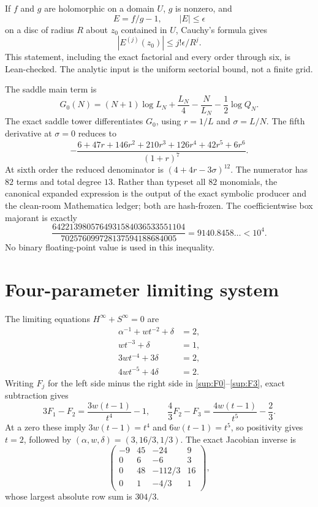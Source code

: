 \documentclass[10pt]{article}
\begin{document}
If $f$ and $g$ are holomorphic on a domain $U$, $g$ is nonzero, and
\[
 E=f/g-1,\qquad |E|\le\epsilon
\]
on a disc of radius $R$ about $z_0$ contained in $U$, Cauchy's formula gives
\begin{equation}\label{sup:cauchy}
 |E^{(j)}(z_0)|\le j!\epsilon/R^j.
\end{equation}
This statement, including the exact factorial and every order through six,
is Lean-checked.  The analytic input is the uniform sectorial bound, not a
finite grid.

The saddle main term is
\[
 G_0(N)=(N+1)\log L_N+\frac{L_N}{4}-\frac{N}{L_N}
 -\frac12\log Q_N.
\]
The exact saddle tower differentiates $G_0$, using $r=1/L$ and
$\sigma=L/N$.  The fifth derivative
at $\sigma=0$ reduces to
\begin{equation}\label{sup:H5}
 -\frac{6+47r+146r^2+210r^3+126r^4+42r^5+6r^6}{(1+r)^7}.
\end{equation}
At sixth order the reduced denominator is
$(4+4r-3\sigma)^{12}$.  The numerator has $82$ terms and total degree $13$.
Rather than typeset all $82$ monomials, the canonical expanded expression is
the output of the exact symbolic producer and the clean-room Mathematica
ledger; both are hash-frozen.  The coefficientwise box majorant is exactly
\[
 \frac{6422139805764931584036533551104}
 {702576099728137594188684005}=9140.8458\ldots<10^4.
\]
No binary floating-point value is used in this inequality.

\section{Four-parameter limiting system}\label{sup:branch}

The limiting equations $H^\infty+S^\infty=0$ are
\begin{align}
 \alpha^{-1}+wt^{-2}+\delta&=2,\label{sup:F0}\\
 wt^{-3}+\delta&=1,\label{sup:F1}\\
 3wt^{-4}+3\delta&=2,\label{sup:F2}\\
 4wt^{-5}+4\delta&=2.\label{sup:F3}
\end{align}
Writing $F_j$ for the left side minus the right side in
\eqref{sup:F0}--\eqref{sup:F3}, exact subtraction gives
\[
 3F_1-F_2=\frac{3w(t-1)}{t^4}-1,
 \qquad
 \frac43F_2-F_3=\frac{4w(t-1)}{t^5}-\frac23.
\]
At a zero these imply $3w(t-1)=t^4$ and $6w(t-1)=t^5$, so positivity gives
$t=2$, followed by $(\alpha,w,\delta)=(3,16/3,1/3)$.  The exact Jacobian
inverse is
\begin{equation}\label{sup:inverse}
 \begin{pmatrix}
 -9&45&-24&9\\
 0&6&-6&3\\
 0&48&-112/3&16\\
 0&1&-4/3&1
 \end{pmatrix},
\end{equation}
whose largest absolute row sum is $304/3$.
\end{document}
